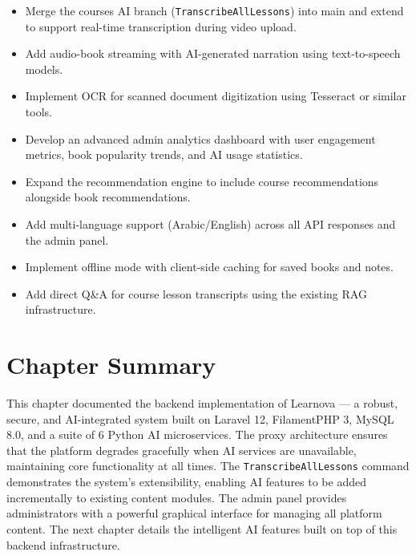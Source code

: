 \begin{itemize}
  \item Merge the courses AI branch (\texttt{TranscribeAllLessons}) into main
        and extend to support real-time transcription during video upload.
  \item Add audio-book streaming with AI-generated narration using
        text-to-speech models.
  \item Implement OCR for scanned document digitization using Tesseract or
        similar tools.
  \item Develop an advanced admin analytics dashboard with user engagement
        metrics, book popularity trends, and AI usage statistics.
  \item Expand the recommendation engine to include course recommendations
        alongside book recommendations.
  \item Add multi-language support (Arabic/English) across all API responses
        and the admin panel.
  \item Implement offline mode with client-side caching for saved books and
        notes.
  \item Add direct Q\&A for course lesson transcripts using the existing RAG
        infrastructure.
\end{itemize}

\section*{Chapter Summary}

This chapter documented the backend implementation of Learnova --- a robust,
secure, and AI-integrated system built on Laravel 12, FilamentPHP 3, MySQL 8.0,
and a suite of 6 Python AI microservices. The proxy architecture ensures that
the platform degrades gracefully when AI services are unavailable, maintaining
core functionality at all times. The \texttt{TranscribeAllLessons} command
demonstrates the system's extensibility, enabling AI features to be added
incrementally to existing content modules. The admin panel provides
administrators with a powerful graphical interface for managing all platform
content. The next chapter details the intelligent AI features built on top of
this backend infrastructure.